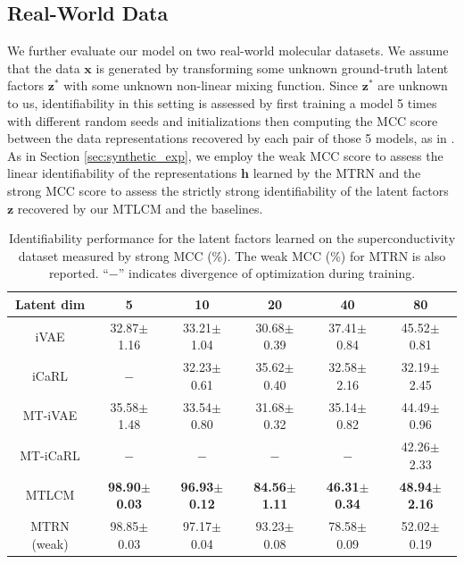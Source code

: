 \documentclass{article} %
\theoremstyle{plain}
\theoremstyle{definition}
\theoremstyle{remark}
\begin{document}
\subsection{Real-World Data}
\vspace{-0.5ex}
We further evaluate our model on two real-world molecular datasets. We assume that the data $\mathbf{x}$ is generated by transforming some unknown ground-truth latent factors $\mathbf{z}^*$ with some unknown non-linear mixing function. Since $\mathbf{z}^*$ are unknown to us, identifiability in this setting is assessed by first training a model 5 times with different random seeds and initializations then computing the MCC score between the data representations recovered by each pair of those 5 models, as in \citet{khemakhem2020ice}. As in Section \ref{sec:synthetic_exp}, we employ the weak MCC score to assess the linear identifiability of the representations $\mathbf{h}$ learned by the MTRN and the strong MCC score to assess the strictly strong identifiability of the latent factors $\mathbf{z}$ recovered by our MTLCM and the baselines.



\begin{table}
\small
\center
\caption{Identifiability performance for the latent factors learned on the superconductivity dataset measured by strong MCC (\%). The weak MCC (\%) for MTRN is also reported. ``$-$'' indicates divergence of optimization during training.}
\vspace{-1.5ex}
\begin{tabular}{cccccc}
\toprule
Latent dim & 5 & 10 & 20 & 40 & 80 \\ \midrule
iVAE         & 32.87$\pm$1.16 & 33.21$\pm$1.04 & 30.68$\pm$0.39 & 37.41$\pm$0.84 & 45.52$\pm$0.81 \\
iCaRL        & $-$ & 32.23$\pm$0.61 & 35.62$\pm$0.40 & 32.58$\pm$2.16 & 32.19$\pm$2.45 \\
MT-iVAE      & 35.58$\pm$1.48 & 33.54$\pm$0.80 & 31.68$\pm$0.32 & 35.14$\pm$0.82 & 44.49$\pm$0.96 \\
MT-iCaRL     & $-$ & $-$ & $-$ & $-$ & 42.26$\pm$2.33 \\
MTLCM        & \textbf{98.90$\pm$0.03} & \textbf{96.93$\pm$0.12} & \textbf{84.56$\pm$1.11} & \textbf{46.31$\pm$0.34} & \textbf{48.94$\pm$2.16} \\
\midrule
MTRN (weak) & 98.85$\pm$0.03 & 97.17$\pm$0.04 & 93.23$\pm$0.08 & 78.58$\pm$0.09 & 52.02$\pm$0.19 \\
\bottomrule
\end{tabular}
\vspace{-1.5ex}
\label{tab:superconductivity-comparison}
\end{table}
\end{document}
